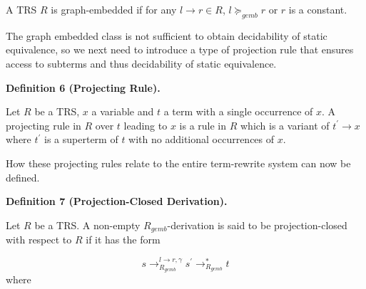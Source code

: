  
 
A TRS $R$ is graph-embedded if for any $l\rightarrow r\in R$, $l\succcurlyeq_{gemb}r$ or $r$ is a constant.\par
 
 
 
 
The graph embedded class is not sufficient to obtain decidability of static equivalence, so we next need to introduce a type of projection rule that ensures access to subterms and thus decidability of static equivalence.\par
 
 
 
\par\medskip\noindent\textbf{Definition 6 (Projecting Rule).}\par
 
 
Let $R$ be a TRS, $x$ a variable and $t$ a term with a single occurrence of $x$. A projecting rule in $R$ over $t$ leading to $x$ is a rule in $R$ which is a variant of $t^{\prime}\rightarrow x$ where $t^{\prime}$ is a superterm of $t$ with no additional occurrences of $x$.\par
 
 
 
 
How these projecting rules relate to the entire term-rewrite system can now be defined.\par
 
 
 
\par\medskip\noindent\textbf{Definition 7 (Projection-Closed Derivation).}\par
 
 
Let $R$ be a TRS. A non-empty $R_{gemb}$-derivation is said to be projection-closed with respect to $R$ if it has the form\par
    \[s\rightarrow_{R_{gemb}}^{l\rightarrow r,\gamma}s^{\prime}\rightarrow_{R_{gemb}%
}^{*}t\]    
where\par
  
